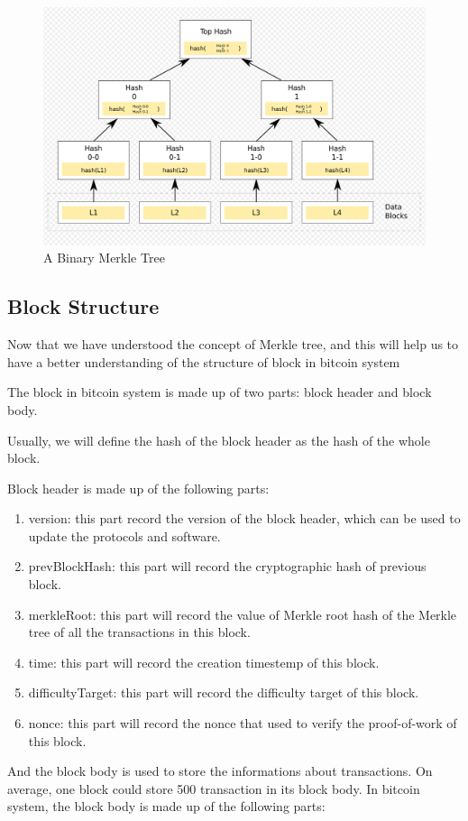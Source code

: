 \documentclass[12pt,a4paper]{article}
\begin{document}
\begin{figure}[htbp!]
	\centering
	\includegraphics[width=0.7\linewidth]{hash_tree.png}
	\caption{A Binary Merkle Tree}
	\label{fig::diagram}
\end{figure}

\subsection{Block Structure}
Now that we have understood the concept of Merkle tree, and this will help us to have a better understanding of the structure of block in bitcoin system

The block in bitcoin system is made up of two parts: block header and block body.

Usually, we will define the hash of the block header as the hash of the whole block.

Block header is made up of the following parts:
\begin{enumerate}
    \item 
    version: this part record the version of the block header, which can be used to update the protocols and software.
    \item
    prevBlockHash: this part will record the cryptographic hash of previous block.
    \item
    merkleRoot: this part will record the value of Merkle root hash of the Merkle tree of all the transactions in this block.
    \item
    time: this part will record the creation timestemp of this block.
    \item
    difficultyTarget: this part will record the difficulty target of this block.
    \item
    nonce: this part will record the nonce that used to verify the proof-of-work of this block.
\end{enumerate}

And the block body is used to store the informations about transactions. On average, one block could store 500 transaction in its block body. In bitcoin system, the block body is made up of the following parts:
\end{document}
